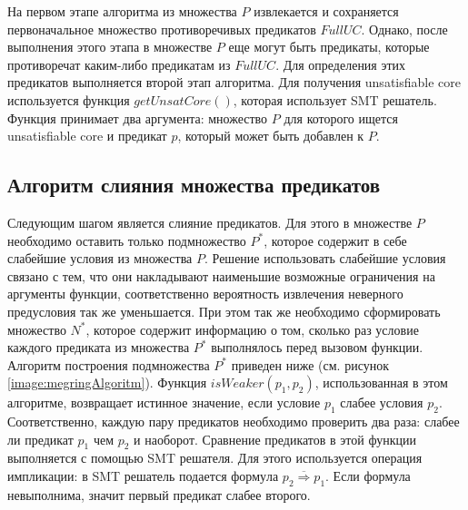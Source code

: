На первом этапе алгоритма из множества $P$ извлекается и сохраняется первоначальное множество противоречивых предикатов $FullUC$. Однако, после выполнения этого этапа в множестве $P$ еще могут быть предикаты, которые противоречат каким-либо предикатам из $FullUC$. Для определения этих предикатов выполняется второй этап алгоритма. Для получения unsatisfiable core используется функция $getUnsatCore()$, которая использует SMT решатель. Функция принимает два аргумента: множество $P$ для которого ищется unsatisfiable core и предикат $p$, который может быть добавлен к $P$.

\subsection{Алгоритм слияния множества предикатов}
Следующим шагом является слияние предикатов. Для этого в множестве $P$ необходимо оставить только подмножество $P^*$, которое содержит в себе слабейшие условия из множества $P$. Решение использовать слабейшие условия связано с тем, что они накладывают наименьшие возможные ограничения на аргументы функции, соответственно вероятность извлечения неверного предусловия так же уменьшается. При этом так же необходимо сформировать множество $N^*$, которое содержит информацию о том, сколько раз условие каждого предиката из множества $P^*$ выполнялось перед вызовом функции. Алгоритм построения подмножества $P^*$ приведен ниже (см. рисунок \ref{image:megringAlgoritm}). Функция $isWeaker(p_1, p_2)$, использованная в этом алгоритме, возвращает истинное значение, если условие $p_1$ слабее условия $p_2$. Соответственно, каждую пару предикатов необходимо проверить два раза: слабее ли предикат $p_1$ чем $p_2$ и наоборот. Сравнение предикатов в этой функции выполняется с помощью SMT решателя. Для этого исполь­зуется операция импликации: в SMT решатель подается форму­ла $\overline{p_2 \Longrightarrow p_1}$. Если формула невыполнима, значит первый предикат слабее второго.
